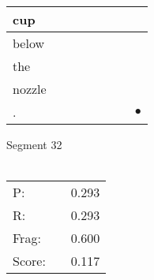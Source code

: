 \documentclass[landscape]{article}
\newcommand{\ssp}{\hspace{2pt}}
\newcommand{\mex}{\cellcolor{g}$\bullet$}
\begin{document}
\begin{tabular}{|l|p{10pt}|p{10pt}|p{10pt}|p{10pt}|p{10pt}|p{10pt}|p{10pt}|}
\hline
\ssp cup \ssp&\hspace{2pt}&\hspace{2pt}&\hspace{2pt}&\hspace{2pt}&\hspace{2pt}&\hspace{2pt}&\hspace{2pt}\\
\hline
\ssp below \ssp&\hspace{2pt}&\hspace{2pt}&\hspace{2pt}&\hspace{2pt}&\hspace{2pt}&\hspace{2pt}&\hspace{2pt}\\
\hline
\ssp the \ssp&\hspace{2pt}&\hspace{2pt}&\hspace{2pt}&\hspace{2pt}&\hspace{2pt}&\hspace{2pt}&\hspace{2pt}\\
\hline
\ssp nozzle \ssp&\hspace{2pt}&\hspace{2pt}&\hspace{2pt}&\hspace{2pt}&\hspace{2pt}&\hspace{2pt}&\hspace{2pt}\\
\hline
\ssp \cellcolor{ref6}. \ssp&\hspace{2pt}&\hspace{2pt}&\hspace{2pt}&\hspace{2pt}&\hspace{2pt}&\hspace{2pt}&\hspace{2pt}\mex\\
\hline
\end{tabular}

\vspace{6pt}
\noindent Segment 32\\\\
\noindent\begin{tabular}{lm{12pt}r}
\hline
P:&&0.293\\
R:&&0.293\\
Frag:&&0.600\\
Score:&&0.117\\
\end{tabular}
\end{document}
